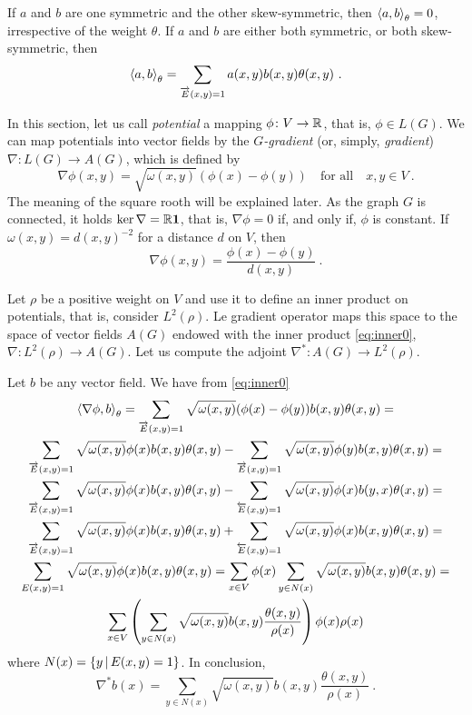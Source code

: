 \documentclass[12pt,a4paper]{amsart}
\begin{document}
If $a$ and $b$ are one symmetric and the other skew-symmetric, then
$\left\langle a,b\right\rangle_{\theta} = 0$, irrespective of the weight $\theta$.
If $a$ and $b$ are either both symmetric, or both skew-symmetric, then
\begin{equation}\label{eq:inner0}
  \left\langle a,b\right\rangle_{\theta} = \sum_{\overrightarrow E(x,y)=1}
  a(x,y)b(x,y) \theta(x,y) \ .
\end{equation}

In this section, let us call \emph{potential} a mapping
$\phi \colon V \to \mathbb{R}$, that is, $\phi\in L(G)$. We can map
potentials into vector fields by the \emph{$G$-gradient} (or, simply,
\emph{gradient}) $\nabla \colon L(G) \to A(G)$, which is defined by
\begin{equation*}
  \nabla \phi(x,y) = \sqrt {\omega(x,y)} (\phi(x) - \phi(y)) \quad
  \text{for all} \quad x,y \in V \ .
\end{equation*}
The meaning of the square rooth will be explained later. As the graph
$G$ is connected, it holds $\ker \nabla = \mathbb{R} \bm 1$, that is,
$\nabla\phi=0$ if, and only if, $\phi$ is constant. If
$\omega(x,y) = d(x,y)^{-2}$ for a distance $d$ on $V$, then
\begin{equation*}
  \nabla \phi (x,y)=\frac{\phi(x) - \phi(y)}{d(x,y)} \ .
\end{equation*}

Let $\rho$ be a positive weight on $V$ and use it to define an inner
product on potentials, that is, consider $L^2(\rho)$. Le gradient
operator maps this space to the space of vector fields $A(G)$ endowed
with the inner product \eqref{eq:inner0}, $\nabla \colon L^2(\rho) \to A(G)$.
Let us compute the adjoint $\nabla^* \colon A(G) \to L^2(\rho)$.

Let $b$ be any vector field. We have from \cref{eq:inner0}
\begin{multline*}
  \left\langle\nabla \phi,b\right\rangle_{\theta} = \sum_{\overrightarrow E(x,y)=1}
  \sqrt{\omega(x,y)}  (\phi(x) - \phi(y)) b(x,y) \theta(x,y) = \\
  \sum_{\overrightarrow E(x,y)=1} \sqrt{\omega(x,y)} \phi(x) b(x,y)
  \theta(x,y) - \sum_{\overrightarrow E(x,y)=1}
  \sqrt{\omega(x,y)}  \phi(y) b(x,y) \theta(x,y) = \\
  \sum_{\overrightarrow E(x,y)=1} \sqrt{\omega(x,y)} \phi(x) b(x,y)
  \theta(x,y) - \sum_{\overleftarrow E(x,y)=1}
  \sqrt{\omega(x,y)}  \phi(x) b(y,x) \theta(x,y) = \\
  \sum_{\overrightarrow E(x,y)=1} \sqrt{\omega(x,y)} \phi(x) b(x,y)
  \theta(x,y) + \sum_{\overleftarrow E(x,y)=1}
  \sqrt{\omega(x,y)}  \phi(x) b(x,y) \theta(x,y) = \\
  \sum_{E(x,y)=1} \sqrt{\omega(x,y)}  \phi(x) b(x,y) \theta(x,y) = 
  \sum_{x \in V} \phi(x) \sum_{y \in N(x)}
  \sqrt{\omega(x,y)}  b(x,y) \theta(x,y) = \\
  \sum_{x \in V} \left(\sum_{y \in N(x)}
  \sqrt{\omega(x,y)}  b(x,y) \frac{\theta(x,y)}{\rho(x)} \right) \phi(x) \rho(x)
\end{multline*}
where $N(x) = \left\{y \, \middle| \, E(x,y)=1 \right\}$. In conclusion,
\begin{equation*}
  \nabla^* b(x) = \sum_{y \in N(x)}
  \sqrt{\omega(x,y)}  b(x,y) \frac{\theta(x,y)}{\rho(x)} \ .
\end{equation*}
\end{document}
